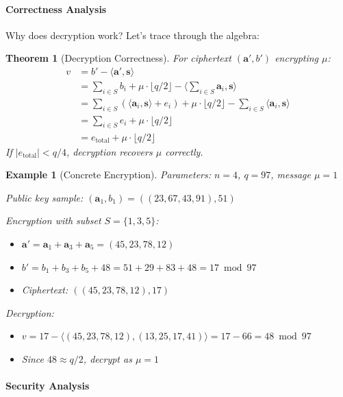\documentclass[11pt,a4paper]{article}
\newtheorem{theorem}{Theorem}
\newtheorem{example}{Example}
\begin{document}
\paragraph{Correctness Analysis}

Why does decryption work? Let's trace through the algebra:

\begin{theorem}[Decryption Correctness]
For ciphertext $(\mathbf{a}', b')$ encrypting $\mu$:
\begin{align}
v &= b' - \langle \mathbf{a}', \mathbf{s} \rangle\\
&= \sum_{i \in S} b_i + \mu \cdot \lfloor q/2 \rfloor - \langle \sum_{i \in S} \mathbf{a}_i, \mathbf{s} \rangle\\
&= \sum_{i \in S} (\langle \mathbf{a}_i, \mathbf{s} \rangle + e_i) + \mu \cdot \lfloor q/2 \rfloor - \sum_{i \in S} \langle \mathbf{a}_i, \mathbf{s} \rangle\\
&= \sum_{i \in S} e_i + \mu \cdot \lfloor q/2 \rfloor\\
&= e_{\text{total}} + \mu \cdot \lfloor q/2 \rfloor
\end{align}
If $|e_{\text{total}}| < q/4$, decryption recovers $\mu$ correctly.
\end{theorem}

\begin{example}[Concrete Encryption]
Parameters: $n = 4$, $q = 97$, message $\mu = 1$

Public key sample: $(\mathbf{a}_1, b_1) = ((23,67,43,91), 51)$

Encryption with subset $S = \{1,3,5\}$:
\begin{itemize}
    \item $\mathbf{a}' = \mathbf{a}_1 + \mathbf{a}_3 + \mathbf{a}_5 = (45, 23, 78, 12)$
    \item $b' = b_1 + b_3 + b_5 + 48 = 51 + 29 + 83 + 48 = 17 \bmod 97$
    \item Ciphertext: $((45,23,78,12), 17)$
\end{itemize}

Decryption:
\begin{itemize}
    \item $v = 17 - \langle(45,23,78,12), (13,25,17,41)\rangle = 17 - 66 = 48 \bmod 97$
    \item Since $48 \approx q/2$, decrypt as $\mu = 1$ \checkmark
\end{itemize}
\end{example}

\paragraph{Security Analysis}
\end{document}

